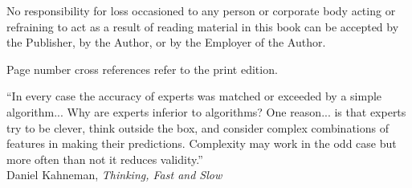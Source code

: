 \vspace{0.85em} No responsibility for loss occasioned to any person or corporate body acting or refraining to act as a result of reading material in this book can be accepted by the Publisher, by the Author, or by the Employer of the Author. \par

\vspace{0.85em} Page number cross references refer to the print edition. \par \endgroup \normalsize

\clearpage \thispagestyle{empty} \begin{center} \vspace*{0.29\textheight} \begin{minipage}{\textwidth} ``In every case the accuracy of experts was matched or exceeded by a simple algorithm... Why are experts inferior to algorithms? One reason... is that experts try to be clever, think outside the box, and consider complex combinations of features in making their predictions. Complexity may work in the odd case but more often than not it reduces validity.''\\[1.5em]
Daniel Kahneman, \textit{Thinking, Fast and Slow} \end{minipage}
\end{center}

\endgroup

